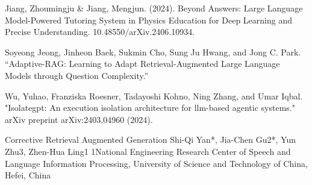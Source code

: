 \documentclass[11pt, a4paper, oneside]{report}
\begin{document}
\begin{enumerate}[leftmargin=3em, label={[{\arabic*}]}, itemsep=6pt]
  \item \label{cite:jiang2024}
       Jiang, Zhoumingju \& Jiang, Mengjun. (2024). Beyond Answers: Large Language Model-Powered Tutoring System in Physics Education for Deep Learning and Precise Understanding. 10.48550/arXiv.2406.10934. 

\item \label{cite:adaptiverag}
        Soyeong Jeong, Jinheon Baek, Sukmin Cho, Sung Ju Hwang, and Jong C. Park.
        ``Adaptive-RAG: Learning to Adapt Retrieval-Augmented Large Language Models through Question Complexity.''

  \item \label{cite:wu2025}
       Wu, Yuhao, Franziska Roesner, Tadayoshi Kohno, Ning Zhang, and Umar Iqbal. "Isolategpt: An execution isolation architecture for llm-based agentic systems." arXiv preprint arXiv:2403.04960 (2024).
  \item \label{cite:crag}
      Corrective Retrieval Augmented Generation
Shi-Qi Yan*, Jia-Chen Gu2*, Yun Zhu3, Zhen-Hua Ling1
1National Engineering Research Center of Speech and Language Information Processing,
University of Science and Technology of China, Hefei, China
\end{enumerate}




\end{document}
